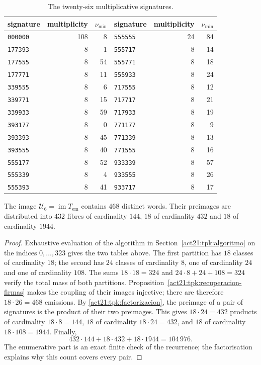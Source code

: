 \begin{minipage}{\linewidth}
\begin{table}[H]
\caption{The twenty-six multiplicative signatures.}
\label{act21:tpk:firmas-multiplicativas}
\begin{tabular}{@{}lrr@{\qquad}lrr@{}}
\toprule
signature&multiplicity&\(\nu_{\min}\)&signature&multiplicity&\(\nu_{\min}\)\\
\midrule
\texttt{000000}&108&8&\texttt{555555}&24&84\\
\texttt{177393}&8&1&\texttt{555717}&8&14\\
\texttt{177555}&8&54&\texttt{555771}&8&18\\
\texttt{177771}&8&11&\texttt{555933}&8&24\\
\texttt{339555}&8&6&\texttt{717555}&8&12\\
\texttt{339771}&8&15&\texttt{717717}&8&21\\
\texttt{339933}&8&59&\texttt{717933}&8&19\\
\texttt{393177}&8&0&\texttt{771177}&8&9\\
\texttt{393393}&8&45&\texttt{771339}&8&13\\
\texttt{393555}&8&40&\texttt{771555}&8&16\\
\texttt{555177}&8&52&\texttt{933339}&8&57\\
\texttt{555339}&8&4&\texttt{933555}&8&26\\
\texttt{555393}&8&41&\texttt{933717}&8&17\\
\bottomrule
\end{tabular}
\end{table}
\end{minipage}\par


\begin{proposition}
\label{act21:tpk:468}
The image \(\mathcal U_6=\operatorname{im}T_{\mathrm{em}}\) contains
\(468\) distinct words. Their preimages are distributed into \(432\)
fibres of cardinality \(144\), \(18\) of cardinality \(432\) and \(18\)
of cardinality \(1944\).
\end{proposition}
\begin{proof}
Exhaustive evaluation of the algorithm in Section~\ref{act21:tpk:algoritmo}
on the indices \(0,\ldots,323\) gives the two tables above.
The first partition has \(18\) classes of cardinality \(18\); the second
has \(24\) classes of cardinality \(8\), one of cardinality \(24\) and
one of cardinality \(108\). The sums \(18\cdot18=324\) and
\(24\cdot8+24+108=324\) verify the total mass of both partitions.
Proposition~\ref{act21:tpk:recuperacion-firmas} makes the coupling of their
images injective; there are therefore \(18\cdot26=468\) emissions.
By \eqref{act21:tpk:factorizacion}, the preimage of a pair of signatures is
the product of their two preimages. This gives \(18\cdot24=432\)
products of cardinality \(18\cdot8=144\), \(18\) of cardinality
\(18\cdot24=432\), and \(18\) of cardinality \(18\cdot108=1944\).
Finally,
\[
 432\cdot144+18\cdot432+18\cdot1944=104\,976.
\]
The enumerative part is an exact finite check of the recurrence; the
factorisation explains why this count covers every pair.
\end{proof}

